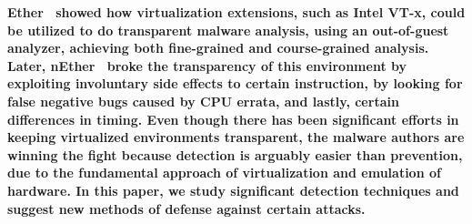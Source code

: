 {\bf Ether~\cite{ether} showed how virtualization extensions, such as Intel
  VT-x, could be utilized to do transparent malware analysis, using an
  out-of-guest analyzer, achieving both fine-grained and course-grained
  analysis. Later, nEther~\cite{nether} broke the transparency of this
  environment by exploiting involuntary side effects to certain instruction, by
  looking for false negative bugs caused by CPU errata, and lastly, certain
  differences in timing. Even though there has been significant efforts in
  keeping virtualized environments transparent, the malware authors are winning
  the fight because detection is arguably easier than prevention, due to the
  fundamental approach of virtualization and emulation of hardware. In this
  paper, we study significant detection techniques and suggest new methods of
  defense against certain attacks. }

